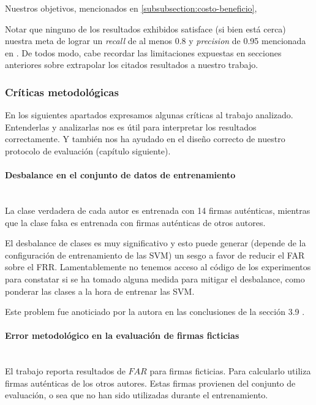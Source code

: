 Nuestros objetivos, mencionados en \ref{subsubsection:costo-beneficio},



Notar que ninguno de los resultados exhibidos satisface (si bien está cerca) nuestra meta de lograr un \textit{recall} de al menos 0.8 y \textit{precision} de 0.95 mencionada en . De todos modo, cabe recordar las limitaciones expuestas en secciones anteriores sobre extrapolar los citados resultados a nuestro trabajo.

\subsubsection{Críticas metodológicas}

En los siguientes apartados expresamos algunas críticas al trabajo analizado. Entenderlas y analizarlas nos es útil para interpretar los resultados correctamente. Y también nos ha ayudado en el diseño correcto de nuestro protocolo de evaluación (capítulo siguiente).

\paragraph{Desbalance en el conjunto de datos de entrenamiento}\mbox{}\\

La clase verdadera de cada autor es entrenada con 14 firmas auténticas, mientras que la clase falsa es entrenada con firmas auténticas de otros autores.

El desbalance de clases es muy significativo y esto puede generar (depende de la configuración de entrenamiento de las SVM) un sesgo a favor de reducir el FAR sobre el FRR. Lamentablemente no tenemos acceso al código de los experimentos para constatar si se ha tomado alguna medida para mitigar el desbalance, como ponderar las clases a la hora de entrenar las SVM.

Este problem fue anoticiado por la autora en las conclusiones de la sección 3.9 \cite{tesis-parodi}.

\paragraph{Error metodológico en la evaluación de firmas ficticias}\mbox{}\\

El trabajo reporta resultados de $FAR$ para firmas ficticias. Para calcularlo utiliza firmas auténticas de los otros autores. Estas firmas provienen del conjunto de evaluación, o sea que no han sido utilizadas durante el entrenamiento.

